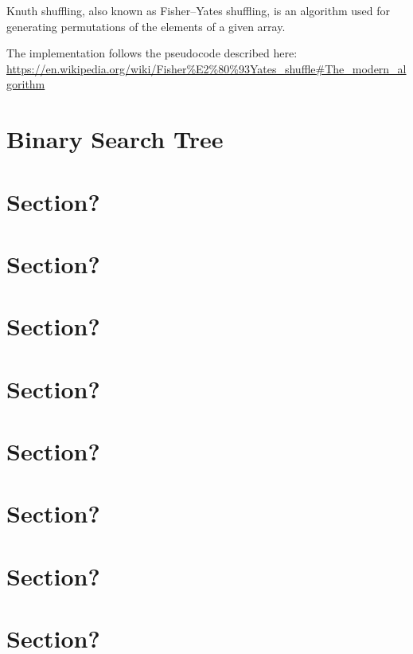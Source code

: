 \documentclass[article]{uom-coursework}
\begin{document}


Knuth shuffling, also known as Fisher--Yates shuffling, is an
algorithm used for generating permutations of the elements of a
given array.

The implementation follows the pseudocode described here:
\url{https://en.wikipedia.org/wiki/Fisher%E2%80%93Yates_shuffle#The_modern_algorithm}

\section{Binary Search Tree}


\section{Section?}
\section{Section?}
\section{Section?}
\section{Section?}
\section{Section?}
\section{Section?}
\section{Section?}
\section{Section?}


\blindtext
\blindtext
\blindtext
\end{document}
